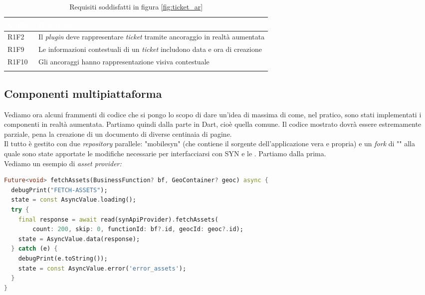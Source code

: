 {
    \setlength{\freewidth}{\dimexpr\textwidth-10\tabcolsep}
    \renewcommand{\arraystretch}{1.5}
    \centering
    \setlength{\aboverulesep}{0pt}
    \setlength{\belowrulesep}{0pt}
    \begin{longtable}{C{.15\freewidth} C{1\freewidth}}
       \toprule
    \textcolor{white}{\textbf{Codice}}&
    \textcolor{white}{\textbf{Descrizione}}\\
    \toprule
    \endhead

    R1F2 & Il \textit{plugin} deve rappresentare \textit{ticket} tramite ancoraggio in realtà aumentata\\
    R1F9 & Le informazioni contestuali di un \textit{ticket} includono data e ora di creazione\\
    R1F10 & Gli ancoraggi hanno rappresentazione visiva contestuale\\ 
  
    \bottomrule
    \caption{Requisiti soddisfatti in figura \ref{fig:ticket_ar}}
    \end{longtable}
}

\subsection{Componenti multipiattaforma}
Vediamo ora alcuni frammenti di codice che si pongo lo scopo di dare un'idea di massima di come, nel pratico, sono stati implementati i componenti in realtà aumentata. Partiamo quindi dalla parte in Dart, cioè quella comune. Il codice mostrato dovrà essere estremamente parziale, pena la creazione di un documento di diverse centinaia di pagine.\\
Il tutto è gestito con due \textit{repository} parallele: "mobilesyn" (che contiene il sorgente dell'applicazione vera e propria) e un \textit{fork} di "\aplug{}" alla quale sono state apportate le modifiche necessarie per interfacciarsi con SYN e le \asa{}. Partiamo dalla prima.\\
Vediamo un esempio di \textit{asset provider:}

\begin{lstlisting}[language=dart, label={lst:mobilesyn_asset_provider},firstnumber=1,caption={mobilesyn \textit{asset provider}}]
Future<void> fetchAssets(BusinessFunction? bf, GeoContainer? geoc) async {
  debugPrint("FETCH-ASSETS");
  state = const AsyncValue.loading();
  try {
    final response = await read(synApiProvider).fetchAssets(
        count: 200, skip: 0, functionId: bf?.id, geocId: geoc?.id);
    state = AsyncValue.data(response);
  } catch (e) {
    debugPrint(e.toString());
    state = const AsyncValue.error('error_assets');
  }
}
\end{lstlisting} 

